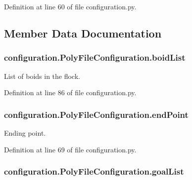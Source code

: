 Definition at line 60 of file configuration.\-py.



\subsection{Member Data Documentation}
\hypertarget{classconfiguration_1_1PolyFileConfiguration_a34104bbe3eb34147465a4d9e05d6c6b6}{
\subsubsection[{boid\-List}]{\setlength{\rightskip}{0pt plus 5cm}configuration.\-Poly\-File\-Configuration.\-boid\-List}}\label{classconfiguration_1_1PolyFileConfiguration_a34104bbe3eb34147465a4d9e05d6c6b6}


List of boids in the flock. 



Definition at line 86 of file configuration.\-py.

\hypertarget{classconfiguration_1_1PolyFileConfiguration_acb9da93ddecef1bb34bbce601473f0f1}{
\subsubsection[{end\-Point}]{\setlength{\rightskip}{0pt plus 5cm}configuration.\-Poly\-File\-Configuration.\-end\-Point}}\label{classconfiguration_1_1PolyFileConfiguration_acb9da93ddecef1bb34bbce601473f0f1}


Ending point. 



Definition at line 69 of file configuration.\-py.

\hypertarget{classconfiguration_1_1PolyFileConfiguration_a2fd4dfe65bb97105e3ff146d125849df}{
\subsubsection[{goal\-List}]{\setlength{\rightskip}{0pt plus 5cm}configuration.\-Poly\-File\-Configuration.\-goal\-List}}\label{classconfiguration_1_1PolyFileConfiguration_a2fd4dfe65bb97105e3ff146d125849df}


